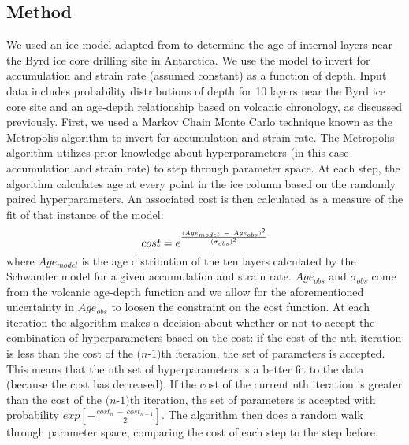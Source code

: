 \documentclass[jgrga]{agutex}
\begin{document}
\begin{article}
\section{Method}\label{method}


We used an ice model adapted from \citet{schwander2001} to determine the age of internal layers near the Byrd ice core drilling site in Antarctica. We use the model to invert for accumulation and strain rate (assumed constant) as a function of depth.  Input data includes probability distributions of depth for 10 layers near the Byrd ice core site and an age-depth relationship based on volcanic chronology, as discussed previously.
	First, we used a Markov Chain Monte Carlo technique known as the Metropolis algorithm to invert for accumulation and strain rate. The Metropolis algorithm utilizes prior knowledge about hyperparameters (in this case accumulation and strain rate) to step through parameter space. At each step, the algorithm calculates age at every point in the ice column based on the randomly paired hyperparameters.  An associated cost is then calculated  as a measure of the fit of that instance of the model:
\begin{equation}
$$cost = e^\frac{(Age_{model}~ - ~Age_{obs})^2}{(\sigma_{obs})^2}$$
\end{equation}
where $Age_{model}$ is the age distribution of the ten layers calculated by the Schwander model for a given accumulation and strain rate. $Age_{obs}$ and $\sigma_{obs}$ come from the volcanic age-depth function and we allow for the aforementioned uncertainty in $Age_{obs}$ to loosen the constraint on the cost function. At each iteration the algorithm makes a decision about whether or not to accept the combination of hyperparameters based on the cost: if the cost of the nth iteration is less than the cost of the $\textit{(n-1)}$th iteration, the set of parameters is accepted. This means that the nth set of hyperparameters is a better fit to the data (because the cost has decreased). If the cost of the current nth iteration is greater than the cost of the $\textit{(n-1)}$th iteration, the set of parameters is accepted with probability $exp[-\frac{cost_n~-~cost_{n-1}}{2}]$. The algorithm then does a random walk through parameter space, comparing the cost of each step to the step before.

\end{article}
\end{document}

